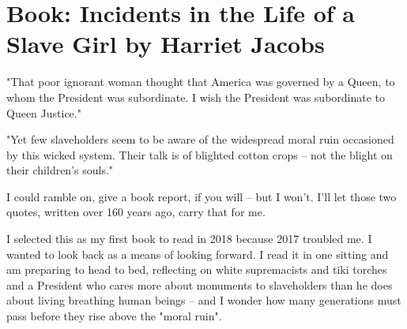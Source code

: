 \onecolumn
\chapter{Book: Incidents in the Life of a Slave Girl by Harriet Jacobs}

\begin{quotebox}
"That poor ignorant woman thought that America was governed by a Queen, to whom the President was subordinate. I wish the President was subordinate to Queen Justice."
\end{quotebox}

\begin{quotebox}
"Yet few slaveholders seem to be aware of the widespread moral ruin occasioned by this wicked system. Their talk is of blighted cotton crops -- not the blight on their children's souls."
\end{quotebox}



I could ramble on, give a book report, if you will -- but I won't. I'll let those two quotes, written over 160 years ago, carry that for me.

I selected this as my first book to read in 2018 because 2017 troubled me. I wanted to look back as a means of looking forward. I read it in one sitting and am preparing to head to bed, reflecting on white supremacists and tiki torches and a President who cares more about monuments to slaveholders than he does about living breathing human beings -- and I wonder how many generations must pass before they rise above the "moral ruin".